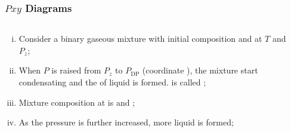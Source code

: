 \documentclass[10pt,compress,handout,ignorenonframetext,unknownkeysallowed]{beamer}
\begin{document}
\begin{frame}
  \frametitle{$Pxy$ Diagrams}
  \begin{columns}
     \begin{column}[l]{0.5\linewidth}
       \begin{enumerate}[i)]
          \item<1-> Consider a binary gaseous mixture with initial composition \red{$\left[x_{1}=0; y_{1}=y_{z}\right]$} and \blue{$\left[x_{2}=0; y_{2}=1-y_{1}\right]$} at $T$ and $P_{z}$;
          \item<2-> When $P$ is raised from $P_{z}$ to $P_{\text{DP}}$ (coordinate ), the mixture start condensating and the  of liquid is formed.  is called {\bf {}};
          \item<3-> Mixture composition at  is \red{$\left[x_{1}=x_{\text{DP}}; y_{1}=y_{z}\right]$} and \blue{$\left[x_{2}=1-x_{1}; y_{2}=1-y_{1}\right]$};
          \item<4-> As the pressure is further increased, more liquid is formed;
       \end{enumerate}
     \end{column}
     \begin{column}[l]{0.5\linewidth} 
     \end{column}
  \end{columns}
\end{frame}
\normalsize
\end{document}
